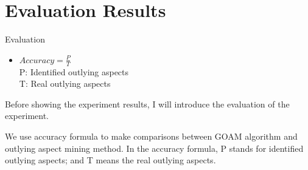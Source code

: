 \documentclass[
size=14pt,
paper=smartboard,  %
mode=present, 		%
display=slides, 	%
style=tuliplab,  	%
pauseslide,
fleqn,leqno]{powerdot}
\begin{document}
\section{Evaluation Results}


\begin{slide}[toc=,bm=]{Evaluation}
	
	\begin{center}
		\begin{itemize}
			
			\item
			\smallskip
			\large
			{$Accuracy = \frac{P}{T}$ \\
				P: Identified outlying aspects \\
				
				T: Real outlying aspects}
			
		\end{itemize}
	\end{center}
	
	\begin{note}
		Before showing the experiment results,
		I will introduce the evaluation of the experiment.
		
		We use accuracy formula to make comparisons between GOAM algorithm
		and outlying aspect mining method.
		In the accuracy formula,
		P stands for identified outlying aspects;
		and T means the real outlying aspects.
	\end{note}
	
\end{slide}
\end{document}
